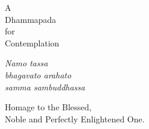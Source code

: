 
\cleartorecto
\thispagestyle{empty}

{\centering

\vspace*{10mm}

\chapterTitleFont\LARGE

A\\
Dhammapada\\
for\\
Contemplation

\vspace*{10mm}

\normalsize

\emph{Namo tassa}\\
\emph{bhagavato arahato}\\
\emph{samma sambuddhassa}

\bigskip

Homage to the Blessed,\\
Noble and Perfectly Enlightened One.

}

